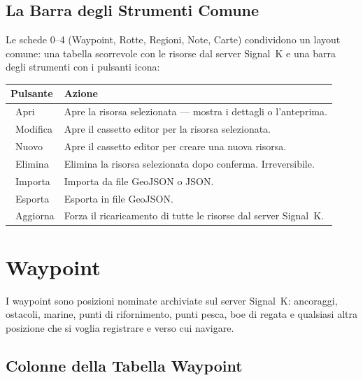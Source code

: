 \section{La Barra degli Strumenti Comune}

Le schede 0--4 (Waypoint, Rotte, Regioni, Note, Carte) condividono un layout comune:
una tabella scorrevole con le risorse dal server Signal~K e una barra degli strumenti
con i pulsanti icona:

\begin{longtable}{L{2.8cm}L{10.9cm}}
\toprule
{}
\color{white}\sffamily\bfseries Pulsante &
\color{white}\sffamily\bfseries Azione \\
\midrule
{}~Apri & Apre la risorsa selezionata --- mostra i dettagli o l'anteprima. \\
~Modifica     & Apre il cassetto editor per la risorsa selezionata. \\
~Nuovo  & Apre il cassetto editor per creare una nuova risorsa. \\
~Elimina    & Elimina la risorsa selezionata dopo conferma. Irreversibile. \\
~Importa & Importa da file GeoJSON o JSON. \\
~Esporta & Esporta in file GeoJSON. \\
~Aggiorna  & Forza il ricaricamento di tutte le risorse dal server Signal~K. \\
\bottomrule
\end{longtable}

\chapter{Waypoint}
\label{ch:waypoint}

I waypoint sono posizioni nominate archiviate sul server Signal~K: ancoraggi, ostacoli,
marine, punti di rifornimento, punti pesca, boe di regata e qualsiasi altra posizione
che si voglia registrare e verso cui navigare.


\section{Colonne della Tabella Waypoint}

